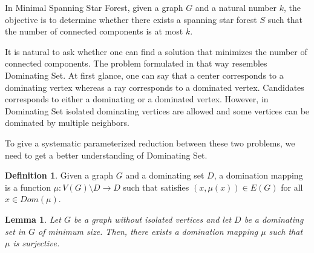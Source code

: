 \documentclass[en]{pracamgr}
\newtheorem{lemma}{Lemma}
\theoremstyle{definition}
\newtheorem{definition}{Definition}
\newcommand{\ssf}{spanning star forest}
\newcommand{\mssfp}{{\sc Minimal Spanning Star Forest}}
\newcommand{\domsetp}{{\sc Dominating Set}}
\begin{document}
In \mssfp{}, given a graph $G$ and a natural number $k$, the objective is to determine whether there exists a \ssf{} $S$ such that the number of connected components is at most $k$.

It is natural to ask whether one can find a solution that minimizes the number of connected components. The problem formulated in that way resembles \domsetp{}. At first glance, one can say that a center corresponds to a dominating vertex whereas a ray corresponds to a dominated vertex. Candidates corresponds to either a dominating or a dominated vertex. However, in \domsetp{} isolated dominating vertices are allowed and some vertices can be dominated by multiple neighbors. 

To give a systematic parameterized reduction between these two problems, we need to get a better understanding of \domsetp{}.

\begin{definition}
	Given a graph $G$ and a dominating set $D$, a {\normalfont domination mapping} is a function $\mu:V(G) \setminus D \rightarrow D$ such that satisfies $(x,\mu(x)) \in E(G)$ for all $x \in Dom(\mu)$.
\end{definition}

\begin{lemma}\label{dom mapping}
	Let $G$ be a graph without isolated vertices and let $D$ be a dominating set in $G$ of minimum size. Then, there exists a domination mapping $\mu$ such that $\mu$ is surjective.
\end{lemma}
\end{document}
